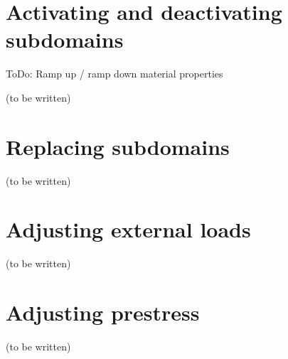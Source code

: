 \section{Activating and deactivating subdomains}
\label{chap:stages-subdomain-activation-deactivation}

ToDo: Ramp up / ramp down material properties

(to be written)

\section{Replacing subdomains}
\label{chap:stages-subdomain-replacement}

(to be written)

\section{Adjusting external loads}
\label{chap:stages-loads}

(to be written)

\section{Adjusting prestress}
\label{chap:stages-prestress}

(to be written)